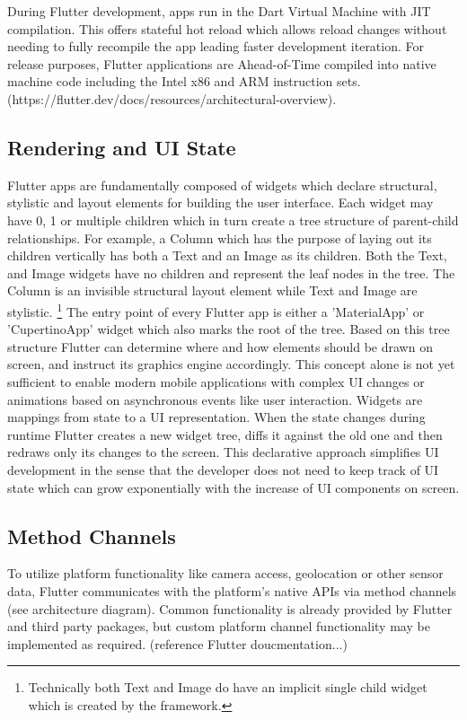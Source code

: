 During Flutter development, apps run in the Dart Virtual Machine with JIT compilation. This offers stateful hot reload which allows reload changes without needing 
to fully recompile the app leading faster development iteration.
For release purposes, Flutter applications are Ahead-of-Time compiled into native machine code including the Intel x86 and ARM instruction sets.
(https://flutter.dev/docs/resources/architectural-overview).


\subsection{Rendering and UI State}
Flutter apps are fundamentally composed of widgets which declare structural, stylistic and layout elements for building the user interface. 
Each widget may have 0, 1 or multiple children which in turn create a tree structure of parent-child relationships. 
For example, a Column which has the purpose of laying out its children vertically has both a Text and an Image as its children. Both the Text,
and Image widgets have no children and represent the leaf nodes in the tree. The Column is an invisible structural layout element while Text and 
Image are stylistic.
\footnote{Technically both Text and Image do have an implicit single child widget which is created by the framework.}
The entry point of every Flutter app is either a 'MaterialApp' or 'CupertinoApp' widget which also marks the root of the tree.
Based on this tree structure Flutter can determine where and how elements should be drawn on screen, and instruct its graphics engine accordingly.
This concept alone is not yet sufficient to enable modern mobile applications with complex UI changes or animations 
based on asynchronous events like user interaction. 
Widgets are mappings from state to a UI representation. When the state changes during runtime Flutter creates a new widget tree, 
diffs it against the old one and then redraws only its changes to the screen.
This declarative approach simplifies UI development in the sense that the developer does not need to keep track of UI state which can grow exponentially
with the increase of UI components on screen. 

\subsection{Method Channels}
To utilize platform functionality like camera access, geolocation or other sensor data, Flutter communicates with the platform's native APIs via 
method channels (see architecture diagram). Common functionality is already provided by Flutter and third party packages, but custom platform channel
functionality may be implemented as required. (reference Flutter doucmentation...)

